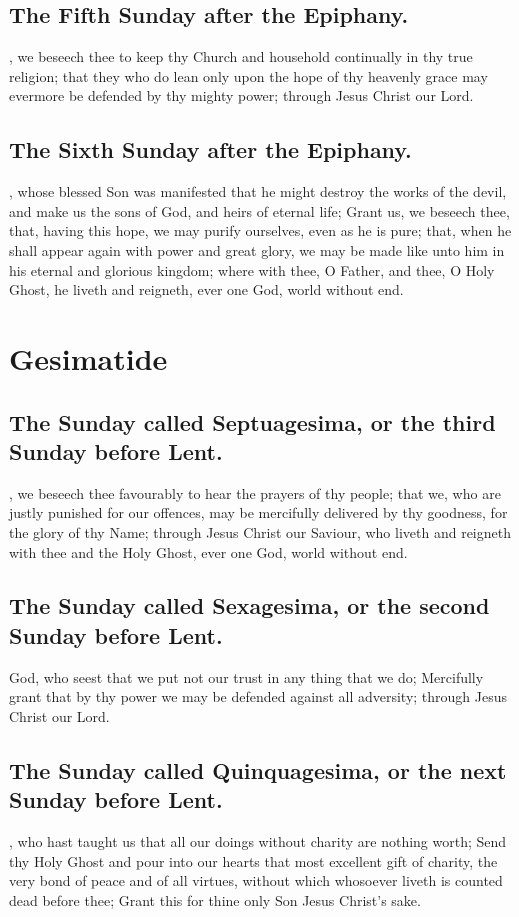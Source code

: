 \subsection{The Fifth Sunday after the Epiphany.}
, we beseech thee to keep thy Church and household continually in thy true religion; that they who do lean only upon the hope of thy heavenly grace may evermore be defended by thy mighty power; through Jesus Christ our Lord.

\subsection{The Sixth Sunday after the Epiphany.}
, whose blessed Son was manifested that he might destroy the works of the devil, and make us the sons of God, and heirs of eternal life; Grant us, we beseech thee, that, having this hope, we may purify ourselves, even as he is pure; that, when he shall appear again with power and great glory, we may be made like unto him in his eternal and glorious kingdom; where with thee, O Father, and thee, O Holy Ghost, he liveth and reigneth, ever one God, world without end.

\section{Gesimatide}

\subsection{The Sunday called Septuagesima, or the third Sunday before Lent.}
, we beseech thee favourably to hear the prayers of thy people; that we, who are justly punished for our offences, may be mercifully delivered by thy goodness, for the glory of thy Name; through Jesus Christ our Saviour, who liveth and reigneth with thee and the Holy Ghost, ever one God, world without end.

\subsection{The Sunday called Sexagesima, or the second Sunday before Lent.}
 God, who seest that we put not our trust in any thing that we do; Mercifully grant that by thy power we may be defended against all adversity; through Jesus Christ our Lord.

\subsection{The Sunday called Quinquagesima, or the next Sunday before Lent.}
, who hast taught us that all our doings without charity are nothing worth; Send thy Holy Ghost and pour into our hearts that most excellent gift of charity, the very bond of peace and of all virtues, without which whosoever liveth is counted dead before thee; Grant this for thine only Son Jesus Christ's sake.

